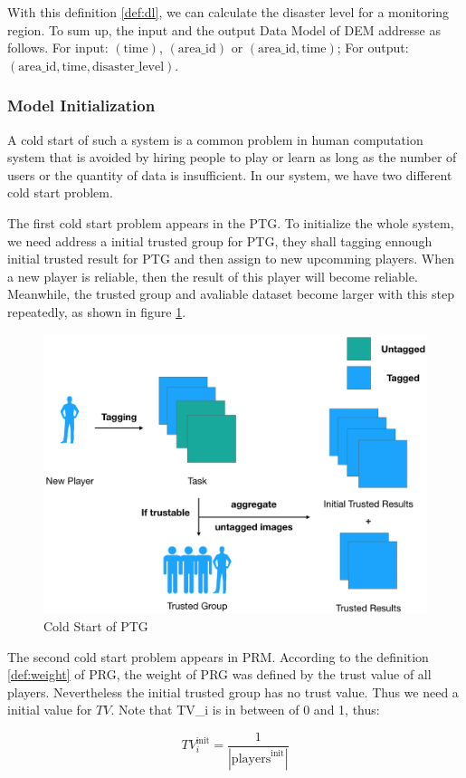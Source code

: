   With this definition \ref{def:dl}, we can calculate the disaster level for a monitoring region.
  To sum up, the input and the output Data Model of DEM addresse as follows. For input:
  $(\text{time})$, $(\text{area\_id})$ or $(\text{area\_id}, \text{time})$; For output:
  $(\text{area\_id}, \text{time}, \text{disaster\_level})$.

  \subsubsection{Model Initialization}

  A cold start of such a system is a common problem in human computation system that 
  is avoided by hiring people to play or learn as long as 
  the number of users or the quantity of data is insufficient.
  In our system, we have two different cold start problem.

  The first cold start problem appears in the PTG. To initialize the whole system, we need
  address a initial trusted group for PTG, they shall tagging ennough initial trusted result
  for PTG and then assign to new upcomming players. When a new player is reliable,
  then the result of this player will become reliable. Meanwhile, the trusted group and avaliable 
  dataset become larger with this step repeatedly, as shown in figure \ref{fig:cold}.

  \begin{figure}[htp]
  \centering
  \includegraphics[width=0.5\columnwidth]{figures/coldstart}
  \caption{Cold Start of PTG}
  \label{fig:cold}
  \end{figure}

  The second cold start problem appears in PRM. According to the definition \ref{def:weight} of PRG, the weight
  of PRG was defined by the trust value of all players. Nevertheless the initial trusted group has
  no trust value. Thus we need a initial value for $TV$. Note that TV\_i is in between of 0 and 1, thus:

  \[
  TV_{i}^{\text{init}} = \frac{1}{|\text{players}^{\text{init}}|}
  \]

